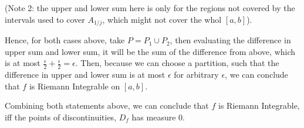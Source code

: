 \documentclass{article}
\begin{document}
\begin{itemize}
    (Note 2: the upper and lower sum here is only for the regions not covered by the intervals used to cover $A_{1/j}$, which might not cover the whol $[a,b]$).

    \hfill

    Hence, for both cases above, take $P=P_1\cup P_2$, then evaluating the difference in upper sum and lower sum, it will be the sum of the difference from above, which is at most $\frac{\epsilon}{2}+\frac{\epsilon}{2}=\epsilon$.
    Then, because we can choose a partition, such that the difference in upper and lower sum is at most $\epsilon$ for arbitrary $\epsilon$,
    we can conclude that $f$ is Riemann Integrable on $[a,b]$.
\end{itemize}

\hfill

Combining both statements above, we can conclude that $f$ is Riemann Integrable, iff the points of discontinuities, $D_f$ has measure $0$.
\end{document}

